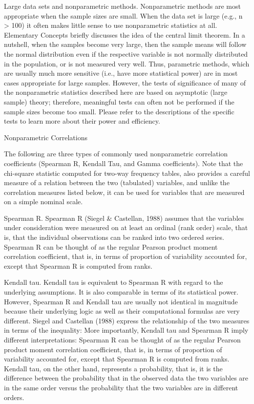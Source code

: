 Large data sets and nonparametric methods. 
Nonparametric methods are most appropriate when the sample sizes are small. 
When the data set is large (e.g., n > 100) it often makes little sense to use nonparametric statistics at all. Elementary Concepts briefly discusses the idea of the central limit theorem. In a nutshell, when the samples become very large, then the sample means will follow the normal distribution even if the respective variable is not normally distributed in the population, or is not measured very well. Thus, parametric methods, which are usually much more sensitive (i.e., have more statistical power) are in most cases appropriate for large samples. However, the tests of significance of many of the nonparametric statistics described here are based on asymptotic (large sample) theory; therefore, meaningful tests can often not be performed if the sample sizes become too small. Please refer to the descriptions of the specific tests to learn more about their power and efficiency.


Nonparametric Correlations

The following are three types of commonly used nonparametric correlation coefficients (Spearman R, Kendall Tau, and Gamma coefficients). Note that the chi-square statistic computed for two-way frequency tables, also provides a careful measure of a relation between the two (tabulated) variables, and unlike the correlation measures listed below, it can be used for variables that are measured on a simple nominal scale.

Spearman R. Spearman R (Siegel & Castellan, 1988) assumes that the variables under consideration were measured on at least an ordinal (rank order) scale, that is, that the individual observations can be ranked into two ordered series. Spearman R can be thought of as the regular Pearson product moment correlation coefficient, that is, in terms of proportion of variability accounted for, except that Spearman R is computed from ranks.

Kendall tau. Kendall tau is equivalent to Spearman R with regard to the underlying assumptions. It is also comparable in terms of its statistical power. However, Spearman R and Kendall tau are usually not identical in magnitude because their underlying logic as well as their computational formulas are very different. Siegel and Castellan (1988) express the relationship of the two measures in terms of the inequality: More importantly, Kendall tau and Spearman R imply different interpretations: Spearman R can be thought of as the regular Pearson product moment correlation coefficient, that is, in terms of proportion of variability accounted for, except that Spearman R is computed from ranks. Kendall tau, on the other hand, represents a probability, that is, it is the difference between the probability that in the observed data the two variables are in the same order versus the probability that the two variables are in different orders.

